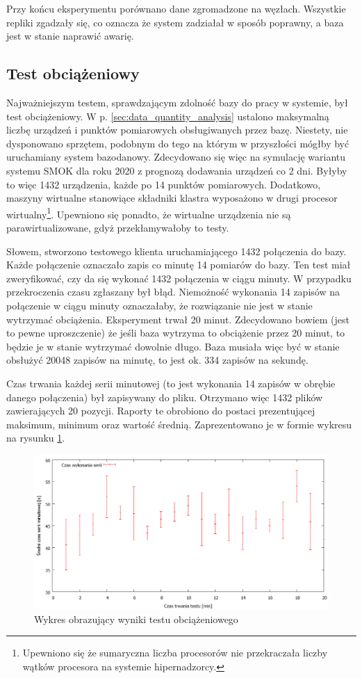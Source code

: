 \documentclass[a4paper,polish,12pt,twoside]{article}
\begin{document}
Przy końcu eksperymentu porównano dane zgromadzone na węzłach. Wszystkie repliki zgadzały się, co oznacza że system zadziałał w sposób poprawny, a baza jest w stanie naprawić awarię. 


	\subsection{Test obciążeniowy}
Najważniejszym testem, sprawdzającym zdolność bazy do pracy w systemie, był test obciążeniowy. W p. \ref{sec:data_quantity_analysis} ustalono maksymalną liczbę urządzeń i punktów pomiarowych obsługiwanych przez bazę. Niestety, nie dysponowano sprzętem, podobnym do tego na którym w przyszłości mógłby być uruchamiany system bazodanowy. Zdecydowano się więc na symulację wariantu systemu SMOK dla roku 2020 z prognozą dodawania urządzeń co 2 dni. Byłyby to więc 1432 urządzenia, każde po 14 punktów pomiarowych. Dodatkowo, maszyny wirtualne stanowiące składniki klastra wyposażono w drugi procesor wirtualny\footnote{Upewniono się że sumaryczna liczba procesorów nie przekraczała liczby wątków procesora na systemie hipernadzorcy.}. Upewniono się ponadto, że wirtualne urządzenia nie są parawirtualizowane, gdyż przekłamywałoby to testy.

Słowem, stworzono testowego klienta uruchamiającego 1432 połączenia do bazy. Każde połączenie oznaczało zapis co minutę 14 pomiarów do bazy. Ten test miał zweryfikować, czy da się wykonać 1432 połączenia w ciągu minuty. W przypadku przekroczenia czasu zgłaszany był błąd. Niemożność wykonania 14 zapisów na połączenie w ciągu minuty oznaczałaby, że rozwiązanie nie jest w stanie wytrzymać obciążenia. Eksperyment trwał 20 minut. Zdecydowano bowiem (jest to pewne uproszczenie) że jeśli baza wytrzyma to obciążenie przez 20 minut, to będzie je w stanie wytrzymać dowolnie długo. Baza musiała więc być w stanie obsłużyć 20048 zapisów na minutę, to jest ok. 334 zapisów na sekundę.

Czas trwania każdej serii minutowej (to jest wykonania 14 zapisów w obrębie danego połączenia) był zapisywany do pliku. Otrzymano więc 1432 plików zawierających 20 pozycji. Raporty te obrobiono do postaci prezentującej maksimum, minimum oraz wartość średnią. Zaprezentowano je w formie wykresu na rysunku \ref{fig:load_plot}.

	\begin{figure}[h]
		\centering \includegraphics[width=15cm]{load_plot}
		\caption{Wykres obrazujący wyniki testu obciążeniowego}
		\label{fig:load_plot}
	\end{figure}
\end{document}
